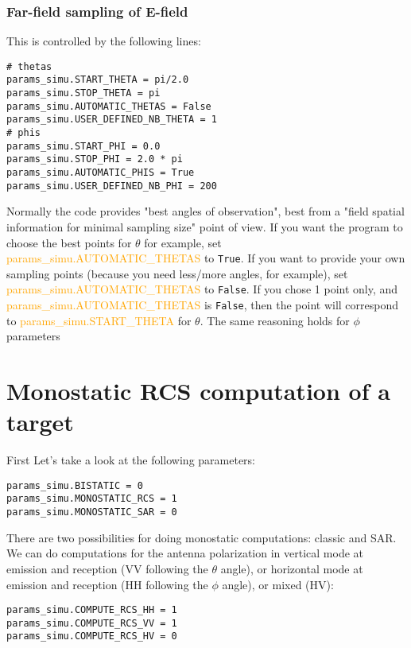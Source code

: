 \documentclass[a4paper,10pt]{book}
\newcommand{\parameter}[1] {\textcolor{orange}{\textsf{#1}}}
\begin{document}
\subsubsection{Far-field sampling of E-field}
%
\par
This is controlled by the following lines:
\begin{verbatim}
# thetas
params_simu.START_THETA = pi/2.0
params_simu.STOP_THETA = pi
params_simu.AUTOMATIC_THETAS = False
params_simu.USER_DEFINED_NB_THETA = 1
# phis
params_simu.START_PHI = 0.0
params_simu.STOP_PHI = 2.0 * pi
params_simu.AUTOMATIC_PHIS = True
params_simu.USER_DEFINED_NB_PHI = 200
\end{verbatim}
%
\par
Normally the code provides "best angles of observation", best from a "field spatial information for minimal sampling size" point of view. If you want the program to choose the best points for $\theta$ for example, set \parameter{params\_simu.AUTOMATIC\_THETAS} to \texttt{True}. If you want to provide your own sampling points (because you need less/more angles, for example), set \parameter{params\_simu.AUTOMATIC\_THETAS} to \texttt{False}. If you chose 1 point only, and \parameter{params\_simu.AUTOMATIC\_THETAS} is \texttt{False}, then the point will correspond to \parameter{params\_simu.START\_THETA} for $\theta$. The same reasoning holds for $\phi$ parameters


\section{Monostatic RCS computation of a target}
%
\par
First Let's take a look at the following parameters:
\begin{verbatim}
params_simu.BISTATIC = 0
params_simu.MONOSTATIC_RCS = 1
params_simu.MONOSTATIC_SAR = 0
\end{verbatim}
There are two possibilities for doing monostatic computations: classic and SAR. We can do computations for the antenna polarization in vertical mode at emission and reception (VV following the $\theta$ angle), or horizontal mode at emission and reception (HH following the $\phi$ angle), or mixed (HV):
\begin{verbatim}
params_simu.COMPUTE_RCS_HH = 1
params_simu.COMPUTE_RCS_VV = 1
params_simu.COMPUTE_RCS_HV = 0
\end{verbatim}
\end{document}
